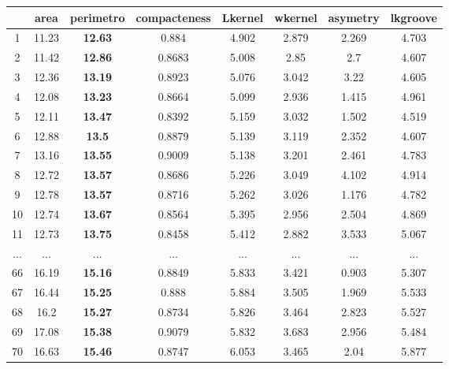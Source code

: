 \begin{table}[!ht]
{\begin{tabular}{|c|c|c|c|c|c|c|c|}
& area & \textbf{perimetro} & compacteness & Lkernel & wkernel & asymetry &lkgroove \\ \hline
\rowcolor[HTML]{EFEFEF} 
1 & 11.23 &\textbf{ 12.63} & 0.884 & 4.902 & 2.879 & 2.269 & 4.703\\ \hline 
\rowcolor[HTML]{EFEFEF} 
2 & 11.42 & \textbf{12.86} & 0.8683 & 5.008 & 2.85 & 2.7 & 4.607\\ \hline 
\rowcolor[HTML]{EFEFEF} 
3 & 12.36 & \textbf{13.19} & 0.8923 & 5.076 & 3.042 & 3.22 & 4.605\\ \hline 
\rowcolor[HTML]{EFEFEF} 
4 & 12.08 & \textbf{13.23} & 0.8664 & 5.099 & 2.936 & 1.415 & 4.961\\ \hline 
\rowcolor[HTML]{EFEFEF} 
5 & 12.11 & \textbf{13.47} & 0.8392 & 5.159 & 3.032 & 1.502 & 4.519\\ \hline 
\rowcolor[HTML]{EFEFEF} 
6 & 12.88 & \textbf{13.5} & 0.8879 & 5.139 & 3.119 & 2.352 & 4.607\\ \hline 
\rowcolor[HTML]{EFEFEF} 
7 & 13.16 & \textbf{13.55} & 0.9009 & 5.138 & 3.201 & 2.461 & 4.783\\ \hline 
\rowcolor[HTML]{EFEFEF} 
8 & 12.72 & \textbf{13.57} & 0.8686 & 5.226 & 3.049 & 4.102 & 4.914\\ \hline 
\rowcolor[HTML]{EFEFEF} 
9 & 12.78 & \textbf{13.57} & 0.8716 & 5.262 & 3.026 & 1.176 & 4.782\\ \hline 
\rowcolor[HTML]{EFEFEF} 
10 & 12.74 & \textbf{13.67} & 0.8564 & 5.395 & 2.956 & 2.504 & 4.869\\ \hline 
11 & 12.73 & \textbf{13.75} & 0.8458 & 5.412 & 2.882 & 3.533 & 5.067\\ \hline 
... & ... & ... & ... & ... & ... & ... & ...\\ \hline 
66 & 16.19 & \textbf{15.16} & 0.8849 & 5.833 & 3.421 & 0.903 & 5.307\\ \hline 
\rowcolor[HTML]{EFEFEF} 
67 & 16.44 & \textbf{15.25} & 0.888 & 5.884 & 3.505 & 1.969 & 5.533\\ \hline 
\rowcolor[HTML]{EFEFEF} 
68 & 16.2 & \textbf{15.27} & 0.8734 & 5.826 & 3.464 & 2.823 & 5.527\\ \hline 
\rowcolor[HTML]{EFEFEF} 
69 & 17.08 & \textbf{15.38} & 0.9079 & 5.832 & 3.683 & 2.956 & 5.484\\ \hline 
\rowcolor[HTML]{EFEFEF} 
70 & 16.63 & \textbf{15.46} & 0.8747 & 6.053 & 3.465 & 2.04 & 5.877\\ \hline 
\end{tabular}
    }
    
    
 \label{tab:analise:seeds:cluster1}
\end{table}

